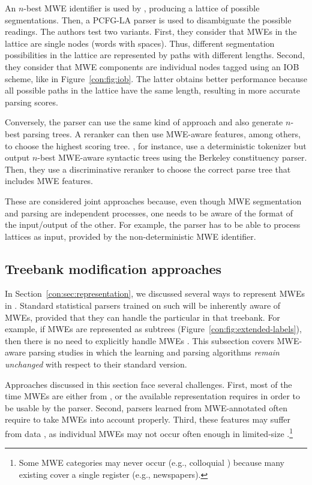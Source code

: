 \documentclass[output=paper]{langsci/langscibook}
\begin{document}
An $n$-best MWE identifier is used by \citet{constant13combining}, producing a lattice of possible segmentations. Then, a PCFG-LA parser is used to disambiguate the possible readings. The authors test two variants. First, they consider that MWEs in the lattice are single nodes (words with spaces). 
Thus, different segmentation possibilities in the lattice are represented by paths with different lengths. Second, they consider that MWE components are individual nodes tagged using an IOB scheme, like in Figure~\ref{con:fig:iob}. The latter obtains better performance because all possible paths in the lattice have the same length, resulting in more accurate parsing scores.

Conversely, the parser can use the same kind of approach and also generate $n$-best parsing trees.
A reranker can then use MWE-aware features, among others, to choose the highest scoring tree. \citet{constant12acl}, for instance, use a deterministic tokenizer but output $n$-best MWE-aware syntactic trees using the Berkeley constituency parser. Then, they use a discriminative reranker to choose the correct parse tree that includes MWE features.  




These are considered joint approaches because, even though MWE segmentation and parsing are independent processes, one needs to be aware of the format of the input/output of the other.
For example, the parser has to be able to process lattices as input, provided by the non-deterministic MWE identifier.





\subsection{Treebank modification approaches}
\label{con:ssec:joint:data}

In Section~\ref{con:sec:representation}, we discussed several ways to represent MWEs in .
Standard statistical parsers trained on such  will be inherently aware of MWEs, provided that they can handle the particular  in that treebank.
For example, if MWEs are represented as subtrees (Figure~\ref{con:fig:extended-labels}), then there is no need to explicitly handle MWEs \citep{nivre16}.
This subsection covers MWE-aware parsing studies   in which the learning and parsing algorithms \emph{remain unchanged} with respect to their standard version.

Approaches discussed in this section face several challenges.
First, most of the time MWEs are either  from , or the available representation requires  in order to be usable by the parser.
Second, parsers learned from MWE-annotated  often require  to take MWEs into account properly. Third, these features may suffer from data , as individual MWEs may not occur often enough in limited-size .\footnote{
Some MWE categories may never occur (e.g., colloquial ) because many existing  cover a single register (e.g., newspapers).}
\end{document}
